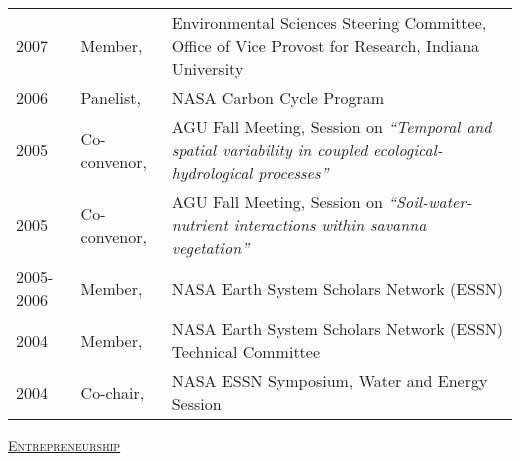 \documentclass[10pt]{report}
\begin{document}
\begin{longtable}{p{.75in} p{1.1in} p{4.2in}}
2007 & Member, & Environmental Sciences Steering Committee, Office of Vice Provost for Research,  Indiana University  \\ 
2006 & Panelist, & NASA Carbon Cycle Program \\
2005 & Co-convenor, &  AGU Fall Meeting, Session on \emph{``Temporal and spatial variability in coupled ecological-hydrological processes''} \\
2005 & Co-convenor, &  AGU Fall Meeting, Session on \emph{``Soil-water-nutrient interactions within savanna vegetation''}  \\
2005-2006 & Member, &  NASA Earth System Scholars Network (ESSN)    \\ 
2004 & Member, &  NASA Earth System Scholars Network (ESSN) Technical Committee \\
2004 & Co-chair, &  NASA ESSN Symposium, Water and Energy Session \\



\end{longtable}

\vspace*{.1in}
\textsc{\underline{Entrepreneurship}}
\end{document}
